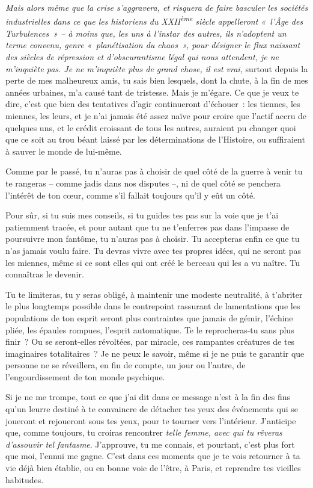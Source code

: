 \documentclass[
  extrafontsizes,
  oneside,
  14pt
]{memoir}
\begin{document}
\emph{Mais alors même que la crise s'aggravera, et risquera de faire
basculer les sociétés industrielles dans ce que les historiens du
XXII\textsuperscript{ème} siècle appelleront «~l'Âge des Turbulences~» -- à
moins que, les uns à l'instar des autres, ils n'adoptent un terme convenu,
genre «~planétisation du chaos~», pour désigner le flux naissant des siècles de
répression et d'obscurantisme légal qui nous attendent, je ne m'inquiète pas.
Je ne m'inquiète plus de grand chose, il est vrai,} surtout depuis la perte de
mes malheureux amis, tu sais bien lesquels, dont la chute, à la fin de mes
années urbaines, m'a causé tant de tristesse. Mais je m'égare. Ce que je veux
te dire, c'est que bien des tentatives d'agir continueront d'échouer~: les
tiennes, les miennes, les leurs, et je n'ai jamais été assez naïve pour croire
que l'actif accru de quelques uns, et le crédit croissant de tous les autres,
auraient pu changer quoi que ce soit au trou béant laissé par les
déterminations de l'Histoire, ou suffiraient à sauver le monde de lui-même.

Comme par le passé, tu n'auras pas à choisir de quel côté de la guerre à
venir tu te rangeras -- comme jadis dans nos disputes --, ni de quel
côté se penchera l'intérêt de ton cœur, comme s'il fallait toujours
qu'il y eût un côté.

Pour sûr, si tu suis mes conseils, si tu guides tes pas sur la voie que
je t'ai patiemment tracée, et pour autant que tu ne t'enferres pas dans
l'impasse de poursuivre mon fantôme, tu n'auras pas à choisir. Tu
accepteras enfin ce que tu n'as jamais voulu faire. Tu devras vivre avec
tes propres idées, qui ne seront pas les miennes, même si ce sont elles
qui ont créé le berceau qui les a vu naître. Tu connaîtras le devenir.

Tu te limiteras, tu y seras obligé, à maintenir une modeste neutralité,
à t'abriter le plus longtemps possible dans le contrepoint rassurant de
lamentations que les populations de ton esprit seront plus contraintes
que jamais de gémir, l'échine pliée, les épaules rompues, l'esprit
automatique. Te le reprocheras-tu sans plus finir~? Ou se seront-elles
révoltées, par miracle, ces rampantes créatures de tes imaginaires
totalitaires~? Je ne peux le savoir, même si je ne puis te garantir que
personne ne se réveillera, en fin de compte, un jour ou l'autre, de
l'engourdissement de ton monde psychique.

Si je ne me trompe, tout ce que j'ai dit dans ce message n'est à la fin
des fins qu'un leurre destiné à te convaincre de détacher tes yeux des
événements qui se joueront et rejoueront sous tes yeux, pour te tourner
vers l'intérieur. J'anticipe que, comme toujours, tu croiras rencontrer
\emph{telle femme, avec qui tu rêveras d'assouvir tel fantasme}.
J'approuve, tu me connais, et pourtant, c'est plus fort que moi, l'ennui
me gagne. C'est dans ces moments que je te vois retourner à ta vie déjà
bien établie, ou en bonne voie de l'être, à Paris, et reprendre tes
vieilles habitudes.
\end{document}
